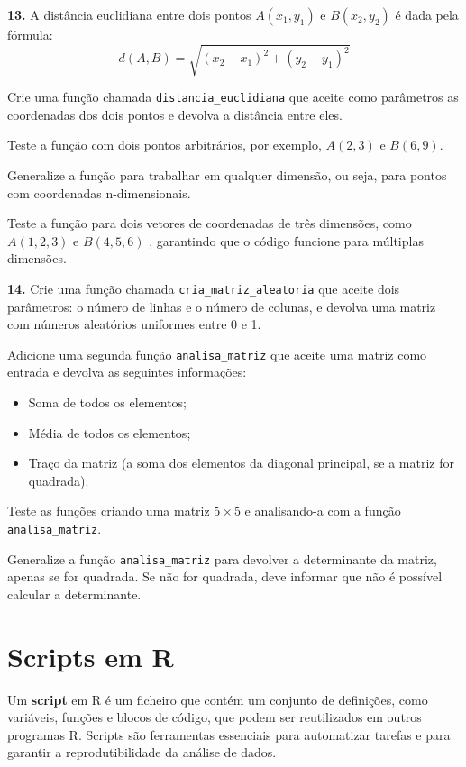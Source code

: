 \documentclass[
]{book}
\providecommand{\tightlist}{%
  \setlength{\itemsep}{0pt}\setlength{\parskip}{0pt}}
\begin{document}
\textbf{13.} A distância euclidiana entre dois pontos \(A(x_1, y_1)\) e \(B(x_2, y_2)\) é dada pela fórmula:
\[d(A, B) = \sqrt{(x_2 - x_1)^2 + (y_2 - y_1)^2}\]

Crie uma função chamada \texttt{distancia\_euclidiana} que aceite como parâmetros as coordenadas dos dois pontos e devolva a distância entre eles.

Teste a função com dois pontos arbitrários, por exemplo, \(A(2, 3)\) e \(B(6, 9)\).

Generalize a função para trabalhar em qualquer dimensão, ou seja, para pontos com coordenadas n-dimensionais.

Teste a função para dois vetores de coordenadas de três dimensões, como \(A(1, 2, 3)\) e \(B(4, 5, 6)\) , garantindo que o código funcione para múltiplas dimensões.

\textbf{14.} Crie uma função chamada \texttt{cria\_matriz\_aleatoria} que aceite dois parâmetros: o número de linhas e o número de colunas, e devolva uma matriz com números aleatórios uniformes entre 0 e 1.

Adicione uma segunda função \texttt{analisa\_matriz} que aceite uma matriz como entrada e devolva as seguintes informações:

\begin{itemize}
\tightlist
\item
  Soma de todos os elementos;
\item
  Média de todos os elementos;
\item
  Traço da matriz (a soma dos elementos da diagonal principal, se a matriz for quadrada).
\end{itemize}

Teste as funções criando uma matriz \(5 \times 5\) e analisando-a com a função \texttt{analisa\_matriz}.

Generalize a função \texttt{analisa\_matriz} para devolver a determinante da matriz, apenas se for quadrada. Se não for quadrada, deve informar que não é possível calcular a determinante.

\chapter{Scripts em R}\label{scripts-em-r}

Um \textbf{script} em R é um ficheiro que contém um conjunto de definições,
como variáveis, funções e blocos de código, que podem ser reutilizados
em outros programas R. Scripts são ferramentas essenciais para
automatizar tarefas e para garantir a reprodutibilidade da análise de
dados.
\end{document}
